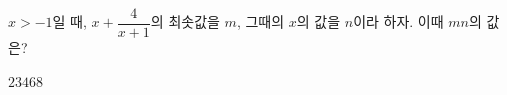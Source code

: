 $x>-1$일 때, $x+\dfrac{4}{x+1}$의 최솟값을 $m$, 그때의 $x$의 값을 $n$이라 하자. 이때 $mn$의 값은?
\begin{choices32}{$2$}{$3$}{$4$}{$6$}{$8$}\end{choices32}
